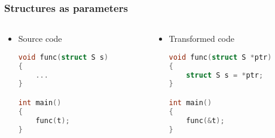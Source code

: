 \documentclass{beamer}
\begin{document}
\begin{frame}[fragile]
    \frametitle{Structures as parameters}

    \begin{columns}
        \begin{column}[]{0.4\textwidth}
            \begin{itemize}
                \item Source code
                      \begin{lstlisting}[language=C]
void func(struct S s)
{
    ...
}

int main()
{
    func(t);
}
                    \end{lstlisting}
            \end{itemize}

        \end{column}

        \begin{column}[]{0.5\textwidth}
            \begin{itemize}
                \item Transformed code
                      \begin{lstlisting}[language=C]
void func(struct S *ptr)
{
    struct S s = *ptr;
}

int main()
{
    func(&t);
}
                \end{lstlisting}
            \end{itemize}
        \end{column}
    \end{columns}

\end{frame}
\end{document}
